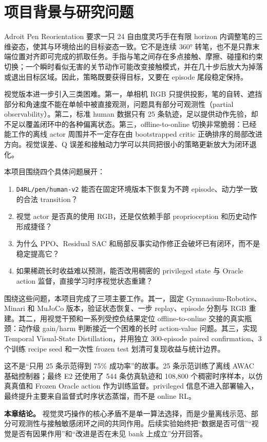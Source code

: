\hypertarget{ux9879ux76eeux80ccux666fux4e0eux7814ux7a76ux95eeux9898}{%
\section{项目背景与研究问题}\label{ux9879ux76eeux80ccux666fux4e0eux7814ux7a76ux95eeux9898}}

Adroit Pen Reorientation 要求一只 24 自由度灵巧手在有限 horizon 内调整笔的三维姿态，使其与环境给出的目标姿态一致。它不是连续 360° 转笔，也不是只靠末端位置对齐即可完成的抓取任务。手指与笔之间存在多点接触、摩擦、碰撞和约束切换；一个瞬时看似无害的关节动作可能改变接触模式，并在几十步后放大为掉落或退出目标区域。因此，策略既要获得目标，又要在 episode 尾段稳定保持。

视觉版本进一步引入三类困难。第一，单相机 RGB 只提供投影，笔的自转、遮挡部分和角速度不能在单帧中被直接观测，问题具有部分可观测性（partial observability）。第二，标准 human 数据只有 25 条轨迹，足以提供动作先验，却不足以覆盖闭环中的各种偏离状态。第三，offline-to-online 切换非常脆弱：已经能工作的离线 actor 周围并不一定存在由 bootstrapped critic 正确排序的局部改进方向。视觉误差、Q 误差和接触动力学可以共同把很小的策略更新放大为闭环退化。

本项目围绕四个具体问题展开：

\begin{enumerate}
\def\labelenumi{\arabic{enumi}.}
\tightlist
\item
  \texttt{D4RL/pen/human-v2} 能否在固定环境版本下恢复为不跨 episode、动力学一致的合法 transition？
\item
  视觉 actor 是否真的使用 RGB，还是仅依赖手部 proprioception 和历史动作形成捷径？
\item
  为什么 PPO、Residual SAC 和局部反事实动作修正会破坏已有闭环，而不是稳定提高它？
\item
  如果稀疏长时收益难以预测，能否改用稠密的 privileged state 与 Oracle action 监督，直接学习时序视觉状态重建？
\end{enumerate}

围绕这些问题，本项目完成了三项主要工作。其一，固定 Gymnasium-Robotics、Minari 和 MuJoCo 版本，验证状态恢复、一步 replay、episode 分割与 RGB 重建。其二，用视觉干预和一系列受控负结果定位 offline-to-online 交接的真实瓶颈：动作级 gain/harm 判断接近一个困难的长时 action-value 问题。其三，实现 Temporal Visual-State Distillation，并用独立 300-episode paired confirmation、3 个训练 recipe seed 和一次性 frozen test 划清可复现收益与统计边界。

这不是``只用 25 条示范得到 75\% 成功率''的故事。25 条示范训练了离线 AWAC 基础控制器；最终 E2 还使用了 544 条仿真轨迹和 108,800 个稠密时序样本，以仿真真值和 Frozen Oracle action 作为训练监督。privileged 信息不进入部署输入，最终提升主要来自监督式时序状态蒸馏，而不是 online RL。

\textbf{本章结论。} 视觉灵巧操作的核心矛盾不是单一算法选择，而是少量离线示范、部分可观测性与接触敏感闭环之间的共同作用。后续实验始终把``数据是否可信''``视觉是否有因果作用''和``改进是否在未见 bank 上成立''分开回答。

\autocite{rajeswaran2017learning,fu2020d4rl}
